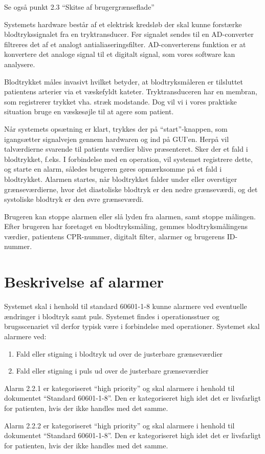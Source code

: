 \vspace{0.7 cm}
Se også punkt 2.3 “Skitse af brugergrænseflade”


Systemets hardware består af et elektrisk kredsløb der skal kunne forstærke blodtrykssignalet fra en tryktransducer. Før signalet sendes til en AD-converter filtreres det af et analogt antialiaseringsfilter. AD-converterens funktion er at konvertere det analoge signal til et digitalt signal, som vores software kan analysere.

Blodtrykket måles invasivt hvilket betyder, at blodtryksmåleren er tilsluttet patientens arterier via et væskefyldt kateter. Tryktransduceren har en membran, som registrerer trykket vha. stræk modstande. Dog vil vi i vores praktiske situation bruge en væskesøjle til at agere som patient. 


Når systemets opsætning er klart, trykkes der på “start”-knappen, som igangsætter signalvejen gennem hardwaren og ind på GUI'en. Herpå vil talværdierne svarende til patients værdier blive præsenteret. Sker der et fald i blodtrykket, f.eks. I forbindelse med en operation, vil systemet registrere dette, og starte en alarm, således brugeren gøres opmærksomme på et fald i blodtrykket. Alarmen startes, når blodtrykket falder under eller overstiger grænseværdierne, hvor det diastoliske blodtryk er den nedre grænseværdi, og det systoliske blodtryk er den øvre grænseværdi.  


Brugeren kan stoppe alarmen eller slå lyden fra alarmen, samt stoppe målingen. Efter brugeren har foretaget en blodtryksmåling, gemmes blodtryksmålingens værdier, patientens CPR-nummer, digitalt filter, alarmer og brugerens ID-nummer.
\vspace{0.9 cm}
\section{Beskrivelse af alarmer}

Systemet skal i henhold til standard 60601-1-8 kunne alarmere ved eventuelle ændringer i blodtryk samt puls. Systemet findes i operationsstuer og brugsscenariet vil derfor typisk være i forbindelse med operationer. Systemet skal alarmere ved:

\begin{enumerate}[2.2.1]
	\item Fald eller stigning i blodtryk ud over de justerbare grænseværdier
	\item Fald eller stigning i puls ud over de justerbare grænseværdier
\end{enumerate}

Alarm 2.2.1 er kategoriseret “high priority” og skal alarmere i henhold til dokumentet “Standard 60601-1-8”. Den er kategoriseret high idet det er livsfarligt for patienten, hvis der ikke handles med det samme.

Alarm 2.2.2 er kategoriseret “high priority” og skal alarmere i henhold til dokumentet “Standard 60601-1-8”. Den er kategoriseret high idet det er livsfarligt for patienten, hvis der ikke handles med det samme.